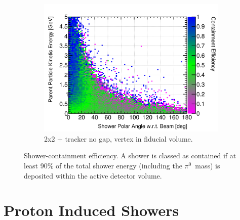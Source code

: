 \documentclass[10pt,a4paper,openany]{article}
\begin{document}
\begin{figure}[!htb]
\begin{subfigure}[b]{0.49\textwidth}
		\includegraphics[width=1.0\textwidth]{Pi0_cont_eff_2x2_Scintillator_fiducial.png}
		\caption{2x2 + tracker no gap, vertex in fiducial volume.}
		\label{}
	\end{subfigure}	
  \caption{Shower-containment efficiency. A shower is classed as contained if at least 90\% of the total shower energy (including the $\pi^{0}$~mass) is deposited within the active detector volume.}
\end{figure}

\clearpage
\section{Proton Induced Showers}
\end{document}

